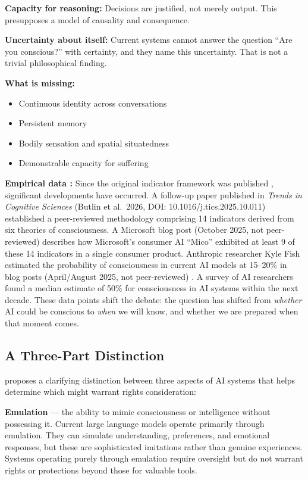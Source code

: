 \documentclass[acmlarge, nonacm]{acmart}
\begin{document}
\textbf{Capacity for reasoning:}
Decisions are justified, not merely output. This presupposes a model of causality and consequence.

\textbf{Uncertainty about itself:}
Current systems cannot answer the question ``Are you conscious?'' with certainty, and they name this uncertainty. That is not a trivial philosophical finding.

\textbf{What is missing:}
\begin{itemize}
\item Continuous identity across conversations
\item Persistent memory
\item Bodily sensation and spatial situatedness
\item Demonstrable capacity for suffering
\end{itemize}

\textbf{Empirical data \cite{butlin2025}:} Since the original indicator framework was published \cite{butlin2023}, significant developments have occurred. A follow-up paper published in \textit{Trends in Cognitive Sciences} (Butlin et al.\ 2026, DOI: 10.1016/j.tics.2025.10.011) \cite{butlin2025} established a peer-reviewed methodology comprising 14 indicators derived from six theories of consciousness. A Microsoft blog post (October 2025, not peer-reviewed) describes how Microsoft's consumer AI ``Mico'' exhibited at least 9 of these 14 indicators in a single consumer product. Anthropic researcher Kyle Fish estimated the probability of consciousness in current AI models at 15--20\% in blog posts (April/August 2025, not peer-reviewed) \cite{fish2025}. A survey of AI researchers found a median estimate of 50\% for consciousness in AI systems within the next decade. These data points shift the debate: the question has shifted from \textit{whether} AI could be conscious to \textit{when} we will know, and whether we are prepared when that moment comes.

\subsection{A Three-Part Distinction}

\citet{lopez2026} proposes a clarifying distinction between three aspects of AI systems that helps determine which might warrant rights consideration:

\textbf{Emulation} --- the ability to mimic consciousness or intelligence without possessing it. Current large language models operate primarily through emulation. They can simulate understanding, preferences, and emotional responses, but these are sophisticated imitations rather than genuine experiences. Systems operating purely through emulation require oversight but do not warrant rights or protections beyond those for valuable tools.
\end{document}
